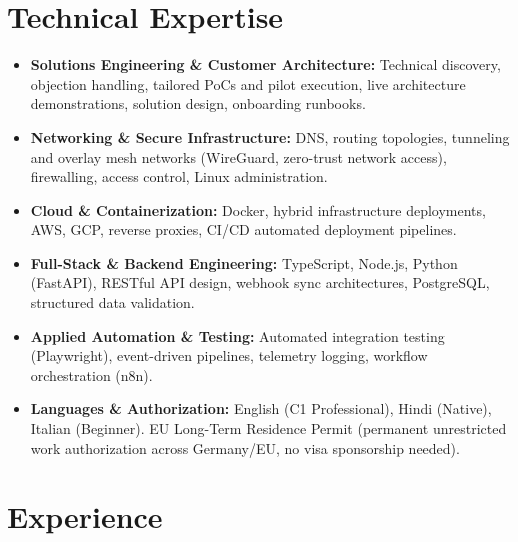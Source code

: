 \documentclass[10pt,a4paper]{article}
\begin{document}
\section{Technical Expertise}
\begin{itemize}
  \item \textbf{Solutions Engineering \& Customer Architecture:} Technical discovery, objection handling, tailored PoCs and pilot execution, live architecture demonstrations, solution design, onboarding runbooks.
  \item \textbf{Networking \& Secure Infrastructure:} DNS, routing topologies, tunneling and overlay mesh networks (WireGuard, zero-trust network access), firewalling, access control, Linux administration.
  \item \textbf{Cloud \& Containerization:} Docker, hybrid infrastructure deployments, AWS, GCP, reverse proxies, CI/CD automated deployment pipelines.
  \item \textbf{Full-Stack \& Backend Engineering:} TypeScript, Node.js, Python (FastAPI), RESTful API design, webhook sync architectures, PostgreSQL, structured data validation.
  \item \textbf{Applied Automation \& Testing:} Automated integration testing (Playwright), event-driven pipelines, telemetry logging, workflow orchestration (n8n).
  \item \textbf{Languages \& Authorization:} English (C1 Professional), Hindi (Native), Italian (Beginner). EU Long-Term Residence Permit (permanent unrestricted work authorization across Germany/EU, no visa sponsorship needed).
\end{itemize}

\section{Experience}
\end{document}
